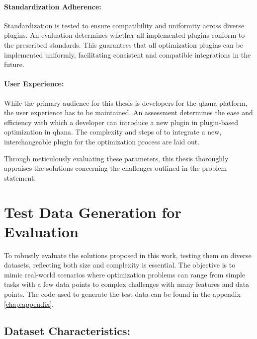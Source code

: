 \documentclass[
  a4paper,  %
  twoside,  %
  bibliography=totoc,
  headsepline,
  cleardoublepage=empty,
  parskip=half,
  draft=false
]{scrbook}
\begin{document}
\paragraph{Standardization Adherence:}
Standardization is tested to ensure compatibility and uniformity across diverse plugins.
An evaluation determines whether all implemented plugins conform to the prescribed standards.
This guarantees that all optimization plugins can be implemented uniformly, facilitating consistent and compatible integrations in the future.

\paragraph{User Experience:}
While the primary audience for this thesis is developers for the \gls{qhana} platform, the user experience has to be maintained.
An assessment determines the ease and efficiency with which a developer can introduce a new plugin in plugin-based optimization in \gls{qhana}.
The complexity and steps of to integrate a new, interchangeable plugin for the optimization process are laid out.

Through meticulously evaluating these parameters, this thesis thoroughly appraises the solutions concerning the challenges outlined in the problem statement.

\section{Test Data Generation for Evaluation}
To robustly evaluate the solutions proposed in this work, testing them on diverse datasets, reflecting both size and complexity is essential.
The objective is to mimic real-world scenarios where optimization problems can range from simple tasks with a few data points to complex challenges with many features and data points.
The code used to generate the test data can be found in the appendix \ref{chap:appendix}.

\subsection{Dataset Characteristics:}
\end{document}

